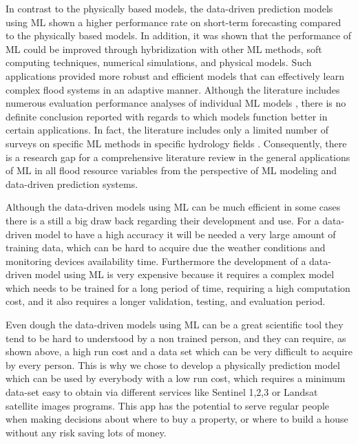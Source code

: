 \documentclass[12pt, a4paper]{report}
\begin{document}
In contrast to the physically based models, the data-driven prediction models using ML shown a higher performance rate on  short-term forecasting compared to the physically based models. In addition,  it was shown that the performance of ML could be improved through hybridization  with other ML methods, soft computing techniques, numerical simulations, and physical models. Such applications provided more robust and efficient models that can effectively learn complex flood systems in an adaptive manner. Although the literature includes numerous evaluation performance analyses of individual ML models \cite{Taherei, Kasiviswanathan, Ravansalar, Mosavi}, there is no definite conclusion reported with regards to which models function better in certain applications. In fact, the literature includes only a limited number of surveys on specific ML methods in specific hydrology fields \cite{Dandagala, Deka, Fotovatikhah}. Consequently, there is a research gap for a comprehensive literature review in the general applications of ML in all flood resource variables from the perspective of ML modeling and data-driven prediction systems.
\par 

Although the data-driven models using ML can be much efficient in some cases there is a still a big draw back regarding their development and use. For a data-driven model to have a high accuracy it will be needed a very large amount of training data, which can be hard to acquire due the weather conditions and monitoring devices availability time. Furthermore the development of a data-driven model using ML is very expensive because it requires a complex model which needs to be trained for a long period of time, requiring a high computation cost, and it also requires a longer validation, testing, and evaluation period.
\par

Even dough the data-driven models using ML can be a great scientific tool they tend to be hard to understood by a non trained person, and they can require, as shown above, a high run cost and a data set which can be very difficult to acquire by every person. This is why we chose to develop a physically prediction model which can be used by everybody with a low run cost, which requires a minimum data-set easy to obtain via different services like Sentinel 1,2,3 or Landsat satellite images programs. This app has the potential to serve regular people when making decisions about where to buy a property, or where to build a house without any risk saving lots of money.
\par
\end{document}
